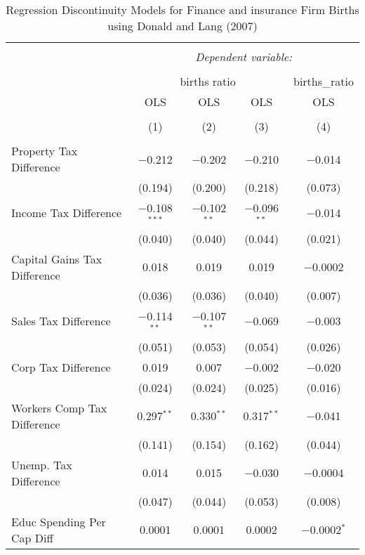 
\begin{table}[!htbp] \centering 
  \caption{Regression Discontinuity Models for  Finance and insurance Firm Births using Donald and Lang (2007)} 
  \label{} 
\begin{tabular}{@{\extracolsep{5pt}}lcccc} 
\\[-1.8ex]\hline 
\hline \\[-1.8ex] 
 & \multicolumn{4}{c}{\textit{Dependent variable:}} \\ 
\cline{2-5} 
\\[-1.8ex] & \multicolumn{3}{c}{births ratio} & births\_ratio \\ 
 & OLS & OLS & OLS & OLS \\ 
\\[-1.8ex] & (1) & (2) & (3) & (4)\\ 
\hline \\[-1.8ex] 
 Property Tax Difference & $-$0.212 & $-$0.202 & $-$0.210 & $-$0.014 \\ 
  & (0.194) & (0.200) & (0.218) & (0.073) \\ 
  Income Tax Difference & $-$0.108$^{***}$ & $-$0.102$^{**}$ & $-$0.096$^{**}$ & $-$0.014 \\ 
  & (0.040) & (0.040) & (0.044) & (0.021) \\ 
  Capital Gains Tax Difference & 0.018 & 0.019 & 0.019 & $-$0.0002 \\ 
  & (0.036) & (0.036) & (0.040) & (0.007) \\ 
  Sales Tax Difference & $-$0.114$^{**}$ & $-$0.107$^{**}$ & $-$0.069 & $-$0.003 \\ 
  & (0.051) & (0.053) & (0.054) & (0.026) \\ 
  Corp Tax Difference & 0.019 & 0.007 & $-$0.002 & $-$0.020 \\ 
  & (0.024) & (0.024) & (0.025) & (0.016) \\ 
  Workers Comp Tax Difference & 0.297$^{**}$ & 0.330$^{**}$ & 0.317$^{**}$ & $-$0.041 \\ 
  & (0.141) & (0.154) & (0.162) & (0.044) \\ 
  Unemp. Tax Difference & 0.014 & 0.015 & $-$0.030 & $-$0.0004 \\ 
  & (0.047) & (0.044) & (0.053) & (0.008) \\ 
  Educ Spending Per Cap Diff & 0.0001 & 0.0001 & 0.0002 & $-$0.0002$^{*}$ \\ 

\end{tabular}
\end{table}
